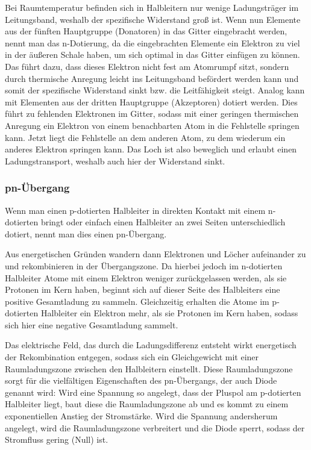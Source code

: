 \documentclass[
	a4paper,
	12pt,
	pagesize,
	ngerman
]{scrartcl}
\begin{document}
	Bei Raumtemperatur befinden sich in Halbleitern nur wenige Ladungsträger im Leitungsband, weshalb der spezifische Widerstand groß ist.
	Wenn nun Elemente aus der fünften Hauptgruppe (Donatoren) in das Gitter eingebracht werden, nennt man das n-Dotierung, da die eingebrachten Elemente ein Elektron zu viel in der äußeren Schale haben, um sich optimal in das Gitter einfügen zu können.
	Das führt dazu, dass dieses Elektron nicht fest am Atomrumpf sitzt, sondern durch thermische Anregung leicht ins Leitungsband befördert werden kann und somit der spezifische Widerstand sinkt bzw. die Leitfähigkeit steigt. %
	Analog kann mit Elementen aus der dritten Hauptgruppe (Akzeptoren) dotiert werden.
	Dies führt zu fehlenden Elektronen im Gitter, sodass mit einer geringen thermischen Anregung ein Elektron von einem benachbarten Atom in die Fehlstelle springen kann.
	Jetzt liegt die Fehlstelle an dem anderen Atom, zu dem wiederum ein anderes Elektron springen kann.
	Das Loch ist also beweglich und erlaubt einen Ladungstransport, weshalb auch hier der Widerstand sinkt.

	\subsubsection{pn-Übergang}
	Wenn man einen p-dotierten Halbleiter in direkten Kontakt mit einem n-dotierten bringt oder einfach einen Halbleiter an zwei Seiten unterschiedlich dotiert, nennt man dies einen pn-Übergang.

	Aus energetischen Gründen wandern dann Elektronen und Löcher aufeinander zu und rekombinieren in der Übergangszone.
	Da hierbei jedoch im n-dotierten Halbleiter Atome mit einem Elektron weniger zurückgelassen werden, als sie Protonen im Kern haben, beginnt sich auf dieser Seite des Halbleiters eine positive Gesamtladung zu sammeln.
	Gleichzeitig erhalten die Atome im p-dotierten Halbleiter ein Elektron mehr, als sie Protonen im Kern haben, sodass sich hier eine negative Gesamtladung sammelt.

	Das elektrische Feld, das durch die Ladungsdifferenz entsteht wirkt energetisch der Rekombination entgegen, sodass sich ein Gleichgewicht mit einer Raumladungszone zwischen den Halbleitern einstellt.
	Diese Raumladungszone sorgt für die vielfältigen Eigenschaften des pn-Übergangs, der auch Diode genannt wird:
	Wird eine Spannung so angelegt, dass der Pluspol am p-dotierten Halbleiter liegt, baut diese die Raumladungszone ab und es kommt zu einem exponentiellen Anstieg der Stromstärke.
	Wird die Spannung andersherum angelegt, wird die Raumladungszone verbreitert und die Diode sperrt, sodass der Stromfluss gering (Null) ist.
\end{document}
